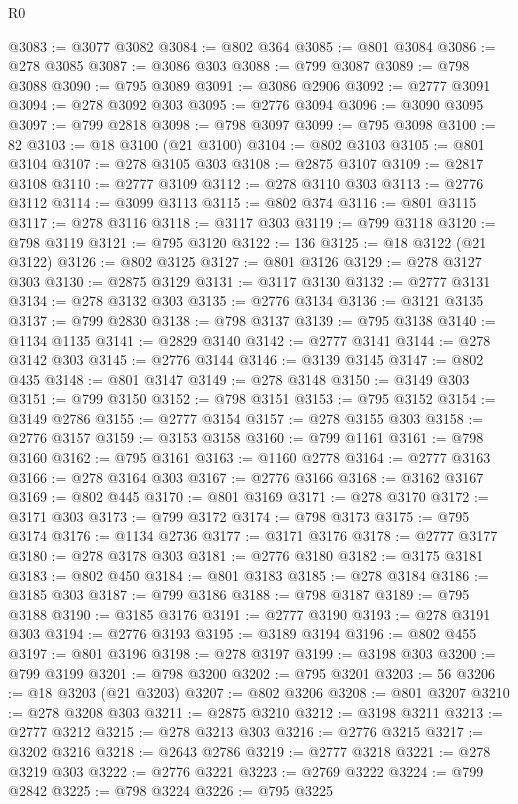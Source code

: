 \begin{lexlean}{R0}
\begin{coremodule}
@3083 := @3077 @3082
@3084 := @802 @364
@3085 := @801 @3084
@3086 := @278 @3085
@3087 := @3086 @303
@3088 := @799 @3087
@3089 := @798 @3088
@3090 := @795 @3089
@3091 := @3086 @2906
@3092 := @2777 @3091
@3094 := @278 @3092 @303
@3095 := @2776 @3094
@3096 := @3090 @3095
@3097 := @799 @2818
@3098 := @798 @3097
@3099 := @795 @3098
@3100 := 82
@3103 := @18 @3100 (@21 @3100)
@3104 := @802 @3103
@3105 := @801 @3104
@3107 := @278 @3105 @303
@3108 := @2875 @3107
@3109 := @2817 @3108
@3110 := @2777 @3109
@3112 := @278 @3110 @303
@3113 := @2776 @3112
@3114 := @3099 @3113
@3115 := @802 @374
@3116 := @801 @3115
@3117 := @278 @3116
@3118 := @3117 @303
@3119 := @799 @3118
@3120 := @798 @3119
@3121 := @795 @3120
@3122 := 136
@3125 := @18 @3122 (@21 @3122)
@3126 := @802 @3125
@3127 := @801 @3126
@3129 := @278 @3127 @303
@3130 := @2875 @3129
@3131 := @3117 @3130
@3132 := @2777 @3131
@3134 := @278 @3132 @303
@3135 := @2776 @3134
@3136 := @3121 @3135
@3137 := @799 @2830
@3138 := @798 @3137
@3139 := @795 @3138
@3140 := @1134 @1135
@3141 := @2829 @3140
@3142 := @2777 @3141
@3144 := @278 @3142 @303
@3145 := @2776 @3144
@3146 := @3139 @3145
@3147 := @802 @435
@3148 := @801 @3147
@3149 := @278 @3148
@3150 := @3149 @303
@3151 := @799 @3150
@3152 := @798 @3151
@3153 := @795 @3152
@3154 := @3149 @2786
@3155 := @2777 @3154
@3157 := @278 @3155 @303
@3158 := @2776 @3157
@3159 := @3153 @3158
@3160 := @799 @1161
@3161 := @798 @3160
@3162 := @795 @3161
@3163 := @1160 @2778
@3164 := @2777 @3163
@3166 := @278 @3164 @303
@3167 := @2776 @3166
@3168 := @3162 @3167
@3169 := @802 @445
@3170 := @801 @3169
@3171 := @278 @3170
@3172 := @3171 @303
@3173 := @799 @3172
@3174 := @798 @3173
@3175 := @795 @3174
@3176 := @1134 @2736
@3177 := @3171 @3176
@3178 := @2777 @3177
@3180 := @278 @3178 @303
@3181 := @2776 @3180
@3182 := @3175 @3181
@3183 := @802 @450
@3184 := @801 @3183
@3185 := @278 @3184
@3186 := @3185 @303
@3187 := @799 @3186
@3188 := @798 @3187
@3189 := @795 @3188
@3190 := @3185 @3176
@3191 := @2777 @3190
@3193 := @278 @3191 @303
@3194 := @2776 @3193
@3195 := @3189 @3194
@3196 := @802 @455
@3197 := @801 @3196
@3198 := @278 @3197
@3199 := @3198 @303
@3200 := @799 @3199
@3201 := @798 @3200
@3202 := @795 @3201
@3203 := 56
@3206 := @18 @3203 (@21 @3203)
@3207 := @802 @3206
@3208 := @801 @3207
@3210 := @278 @3208 @303
@3211 := @2875 @3210
@3212 := @3198 @3211
@3213 := @2777 @3212
@3215 := @278 @3213 @303
@3216 := @2776 @3215
@3217 := @3202 @3216
@3218 := @2643 @2786
@3219 := @2777 @3218
@3221 := @278 @3219 @303
@3222 := @2776 @3221
@3223 := @2769 @3222
@3224 := @799 @2842
@3225 := @798 @3224
@3226 := @795 @3225

\end{coremodule}
\end{lexlean}
